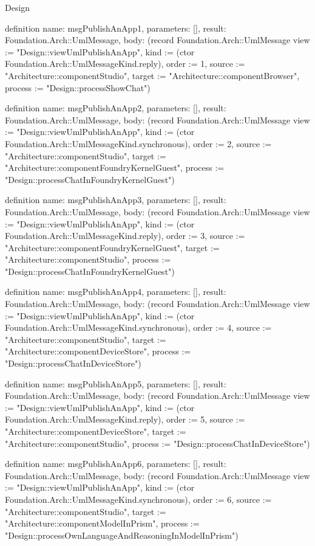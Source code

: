 \begin{lexlean}{Design}
\begin{semanticmodule}
definition{
  name: msgPublishAnApp1,
  parameters: [],
  result: Foundation.Arch::UmlMessage,
  body: (record Foundation.Arch::UmlMessage {view := "Design::viewUmlPublishAnApp", kind := (ctor Foundation.Arch::UmlMessageKind.reply), order := 1, source := "Architecture::componentStudio", target := "Architecture::componentBrowser", process := "Design::processShowChat"})
}

definition{
  name: msgPublishAnApp2,
  parameters: [],
  result: Foundation.Arch::UmlMessage,
  body: (record Foundation.Arch::UmlMessage {view := "Design::viewUmlPublishAnApp", kind := (ctor Foundation.Arch::UmlMessageKind.synchronous), order := 2, source := "Architecture::componentStudio", target := "Architecture::componentFoundryKernelGuest", process := "Design::processChatInFoundryKernelGuest"})
}

definition{
  name: msgPublishAnApp3,
  parameters: [],
  result: Foundation.Arch::UmlMessage,
  body: (record Foundation.Arch::UmlMessage {view := "Design::viewUmlPublishAnApp", kind := (ctor Foundation.Arch::UmlMessageKind.reply), order := 3, source := "Architecture::componentFoundryKernelGuest", target := "Architecture::componentStudio", process := "Design::processChatInFoundryKernelGuest"})
}

definition{
  name: msgPublishAnApp4,
  parameters: [],
  result: Foundation.Arch::UmlMessage,
  body: (record Foundation.Arch::UmlMessage {view := "Design::viewUmlPublishAnApp", kind := (ctor Foundation.Arch::UmlMessageKind.synchronous), order := 4, source := "Architecture::componentStudio", target := "Architecture::componentDeviceStore", process := "Design::processChatInDeviceStore"})
}

definition{
  name: msgPublishAnApp5,
  parameters: [],
  result: Foundation.Arch::UmlMessage,
  body: (record Foundation.Arch::UmlMessage {view := "Design::viewUmlPublishAnApp", kind := (ctor Foundation.Arch::UmlMessageKind.reply), order := 5, source := "Architecture::componentDeviceStore", target := "Architecture::componentStudio", process := "Design::processChatInDeviceStore"})
}

definition{
  name: msgPublishAnApp6,
  parameters: [],
  result: Foundation.Arch::UmlMessage,
  body: (record Foundation.Arch::UmlMessage {view := "Design::viewUmlPublishAnApp", kind := (ctor Foundation.Arch::UmlMessageKind.synchronous), order := 6, source := "Architecture::componentStudio", target := "Architecture::componentModelInPrism", process := "Design::processOwnLanguageAndReasoningInModelInPrism"})
}


\end{semanticmodule}
\end{lexlean}
